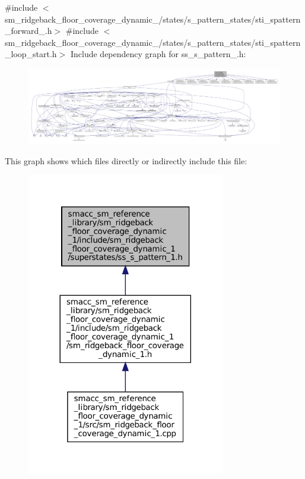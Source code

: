 {\ttfamily \#include $<$sm\+\_\+ridgeback\+\_\+floor\+\_\+coverage\+\_\+dynamic\+\_/states/s\+\_\+pattern\+\_\+states/sti\+\_\+spattern\+\_\+forward\+\_.\+h$>$}\newline
{\ttfamily \#include $<$sm\+\_\+ridgeback\+\_\+floor\+\_\+coverage\+\_\+dynamic\+\_/states/s\+\_\+pattern\+\_\+states/sti\+\_\+spattern\+\_\+loop\+\_\+start.\+h$>$}\newline
Include dependency graph for ss\+\_\+s\+\_\+pattern\+\_.\+h\+:
\nopagebreak
\begin{figure}[H]
\begin{center}
\leavevmode
\includegraphics[width=350pt]{sm__ridgeback__floor__coverage__dynamic__1_2include_2sm__ridgeback__floor__coverage__dynamic__1_278110540d7e17f29e7dc6f56b0db822}
\end{center}
\end{figure}
This graph shows which files directly or indirectly include this file\+:
\nopagebreak
\begin{figure}[H]
\begin{center}
\leavevmode
\includegraphics[width=245pt]{sm__ridgeback__floor__coverage__dynamic__1_2include_2sm__ridgeback__floor__coverage__dynamic__1_af5a4f13e3dbade734e40fd1a7c9e899}
\end{center}
\end{figure}
